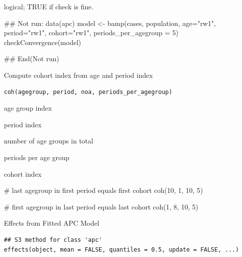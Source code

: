 \documentclass[a4paper]{book}
\begin{document}
%
\begin{Value}
logical; TRUE if check is fine.
\end{Value}
%
\begin{Examples}
\begin{ExampleCode}
## Not run: 
data(apc)
model <- bamp(cases, population, age="rw1", period="rw1", cohort="rw1", periods_per_agegroup = 5)
checkConvergence(model)

## End(Not run)
\end{ExampleCode}
\end{Examples}
%
\begin{Description}
Compute cohort index from age and period index
\end{Description}
%
\begin{Usage}
\begin{verbatim}
coh(agegroup, period, noa, periods_per_agegroup)
\end{verbatim}
\end{Usage}
%
\begin{Arguments}
\begin{ldescription}
\item[\code{agegroup}] age group index

\item[\code{period}] period index

\item[\code{noa}] number of age groups in total

\item[\code{periods\_per\_agegroup}] periods per age group
\end{ldescription}
\end{Arguments}
%
\begin{Value}
cohort index
\end{Value}
%
\begin{Examples}
\begin{ExampleCode}
# last agegroup in first period equals first cohort
coh(10, 1, 10, 5)  

# first agegroup in last period equals last cohort 
coh(1, 8, 10, 5) 
\end{ExampleCode}
\end{Examples}
%
\begin{Description}
Effects from Fitted APC Model
\end{Description}
%
\begin{Usage}
\begin{verbatim}
## S3 method for class 'apc'
effects(object, mean = FALSE, quantiles = 0.5, update = FALSE, ...)
\end{verbatim}
\end{Usage}
\end{document}
